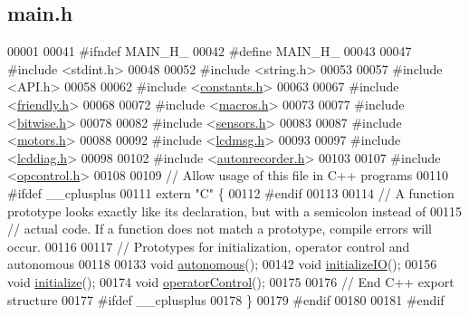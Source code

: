 \hypertarget{main_8h_source}{}\subsection{main.\+h}
\label{main_8h_source}

\begin{DoxyCode}
00001 
00041 \textcolor{preprocessor}{#ifndef MAIN\_H\_}
00042 \textcolor{preprocessor}{#define MAIN\_H\_}
00043 
00047 \textcolor{preprocessor}{#include <stdint.h>}
00048 
00052 \textcolor{preprocessor}{#include <string.h>}
00053 
00057 \textcolor{preprocessor}{#include <API.h>}
00058 
00062 \textcolor{preprocessor}{#include <\hyperlink{constants_8h}{constants.h}>}
00063 
00067 \textcolor{preprocessor}{#include <\hyperlink{friendly_8h}{friendly.h}>}
00068 
00072 \textcolor{preprocessor}{#include <\hyperlink{macros_8h}{macros.h}>}
00073 
00077 \textcolor{preprocessor}{#include <\hyperlink{bitwise_8h}{bitwise.h}>}
00078 
00082 \textcolor{preprocessor}{#include <\hyperlink{sensors_8h}{sensors.h}>}
00083 
00087 \textcolor{preprocessor}{#include <\hyperlink{motors_8h}{motors.h}>}
00088 
00092 \textcolor{preprocessor}{#include <\hyperlink{lcdmsg_8h}{lcdmsg.h}>}
00093 
00097 \textcolor{preprocessor}{#include <\hyperlink{lcddiag_8h}{lcddiag.h}>}
00098 
00102 \textcolor{preprocessor}{#include <\hyperlink{autonrecorder_8h}{autonrecorder.h}>}
00103 
00107 \textcolor{preprocessor}{#include <\hyperlink{opcontrol_8h}{opcontrol.h}>}
00108 
00109 \textcolor{comment}{// Allow usage of this file in C++ programs}
00110 \textcolor{preprocessor}{#ifdef \_\_cplusplus}
00111 \textcolor{keyword}{extern} \textcolor{stringliteral}{"C"} \{
00112 \textcolor{preprocessor}{#endif}
00113 
00114 \textcolor{comment}{// A function prototype looks exactly like its declaration, but with a semicolon instead of}
00115 \textcolor{comment}{// actual code. If a function does not match a prototype, compile errors will occur.}
00116 
00117 \textcolor{comment}{// Prototypes for initialization, operator control and autonomous}
00118 
00133 \textcolor{keywordtype}{void} \hyperlink{main_8h_a3c7ca506bbc071fa740de13805b7f376}{autonomous}();
00142 \textcolor{keywordtype}{void} \hyperlink{main_8h_ad9cda921edb01125bb13c2f86bcf624b}{initializeIO}();
00156 \textcolor{keywordtype}{void} \hyperlink{main_8h_a25a40b6614565f755233080a384c35f1}{initialize}();
00174 \textcolor{keywordtype}{void} \hyperlink{main_8h_ac71a94af413917f27d108e95c4d6f6a7}{operatorControl}();
00175 
00176 \textcolor{comment}{// End C++ export structure}
00177 \textcolor{preprocessor}{#ifdef \_\_cplusplus}
00178 \}
00179 \textcolor{preprocessor}{#endif}
00180 
00181 \textcolor{preprocessor}{#endif}
\end{DoxyCode}
